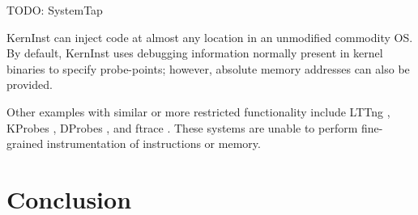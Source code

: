 \documentclass[preprint]{sigplanconf}
\begin{document}
TODO: SystemTap

KernInst \cite{KernInst} can inject code at almost any location in an unmodified commodity OS. By default, KernInst uses debugging information normally present in kernel binaries to specify probe-points; however, absolute memory addresses can also be provided.

Other examples with similar or more restricted functionality include LTTng \cite{LTTng}, KProbes \cite{KProbes}, DProbes \cite{DProbes}, and ftrace \cite{ftrace}. These systems are unable to perform fine-grained instrumentation of instructions or memory.


\section{Conclusion}\label{sec:conclusion}






\end{document}
